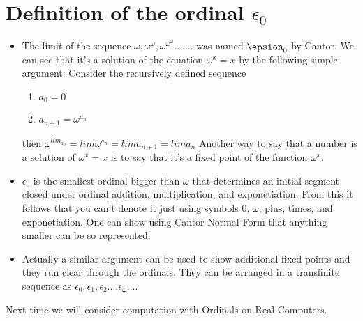 \documentclass[a4paper,10pt]{article}
\begin{document}
\section{Definition of the ordinal $\epsilon_{0}$}
\begin{itemize}
 \item The limit of the sequence
$\omega, \omega^{\omega},\omega^{\omega^{\omega}}.......$
was named $\epsion_{0}$ by Cantor. We can see that it's a solution of the equation $\omega^{x} = x$
by the following simple argument: 
Consider the recursively defined sequence
\begin{enumerate}
 \item $a_{0} = 0$
\item $a_{n+1} = \omega^{a_{n}}$
\end{enumerate}
then 
$\omega^{lim_{a_n}} = lim \omega^{a_{n}} = lim a_{n+1} = lim a_{n}$
Another way to say that a number is a solution of $\omega^{x} = x$ is to say that it's a fixed point of the 
function $\omega^{x}$.
\item $\epsilon_{0}$ is the smallest ordinal bigger than $\omega$ that determines an initial segment
closed under ordinal addition, multiplication, and exponetiation. From this it follows that you can't 
denote it just using symbols 0, $\omega$, plus, times, and exponetiation. One can show using Cantor Normal Form
that anything smaller can be so represented. 
\item Actually a similar argument can be used to show additional fixed points and they run clear through
the ordinals. They can be arranged in a transfinite sequence as 
$\epsilon_0, \epsilon_1, \epsilon_2 .... \epsilon_{\omega}....$
\end{itemize}
Next time we will consider computation with Ordinals on Real Computers.
\end{document}
